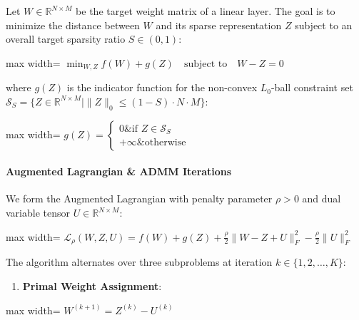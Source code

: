 Let $W \in \mathbb{R}^{N \times M}$ be the target weight matrix of a linear layer. The goal is to minimize the distance between $W$ and its sparse representation $Z$ subject to an overall target sparsity ratio $S \in (0, 1)$:

\begin{center}
\begin{adjustbox}{max width=\columnwidth}
$\displaystyle
\min_{W, Z} f(W) + g(Z) \quad \text{subject to} \quad W - Z = 0
$
\end{adjustbox}
\end{center}

where $g(Z)$ is the indicator function for the non-convex $L_0$-ball constraint set $\mathcal{S}_S = \{ Z \in \mathbb{R}^{N \times M} \mid \|Z\|_0 \le (1 - S) \cdot N \cdot M \}$:

\begin{center}
\begin{adjustbox}{max width=\columnwidth}
$\displaystyle
g(Z) = \begin{cases} 0 \& \text{if } Z \in \mathcal{S}_S \\ +\infty \& \text{otherwise} \end{cases}
$
\end{adjustbox}
\end{center}

\paragraph{Augmented Lagrangian \& ADMM Iterations}

We form the Augmented Lagrangian with penalty parameter $\rho > 0$ and dual variable tensor $U \in \mathbb{R}^{N \times M}$:

\begin{center}
\begin{adjustbox}{max width=\columnwidth}
$\displaystyle
\mathcal{L}_\rho(W, Z, U) = f(W) + g(Z) + \frac{\rho}{2} \| W - Z + U \|_F^2 - \frac{\rho}{2} \| U \|_F^2
$
\end{adjustbox}
\end{center}

The algorithm alternates over three subproblems at iteration $k \in \{1, 2, \dots, K\}$:

\begin{enumerate}
\item \textbf{Primal Weight Assignment}:
\end{enumerate}
\begin{center}
\begin{adjustbox}{max width=\columnwidth}
$\displaystyle
W^{(k+1)} = Z^{(k)} - U^{(k)}
$
\end{adjustbox}
\end{center}

